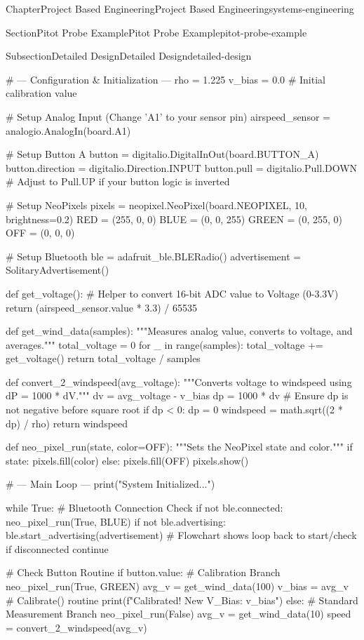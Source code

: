\documentclass[oneside,10pt,]{book}
\numberwithin{equation}{section}
\begin{document}
\begin{chapterptx}{Chapter}{Project Based Engineering}{}{Project Based Engineering}{}{}{systems-engineering}
\begin{sectionptx}{Section}{Pitot Probe Example}{}{Pitot Probe Example}{}{}{pitot-probe-example}
\begin{subsectionptx}{Subsection}{Detailed Design}{}{Detailed Design}{}{}{detailed-design}
\begin{preformatted}
# --- Configuration & Initialization ---
rho = 1.225
v_bias = 0.0  # Initial calibration value

# Setup Analog Input (Change 'A1' to your sensor pin)
airspeed_sensor = analogio.AnalogIn(board.A1)

# Setup Button A
button = digitalio.DigitalInOut(board.BUTTON_A)
button.direction = digitalio.Direction.INPUT
button.pull = digitalio.Pull.DOWN # Adjust to Pull.UP if your button logic is inverted

# Setup NeoPixels
pixels = neopixel.NeoPixel(board.NEOPIXEL, 10, brightness=0.2)
RED = (255, 0, 0)
BLUE = (0, 0, 255)
GREEN = (0, 255, 0)
OFF = (0, 0, 0)

# Setup Bluetooth
ble = adafruit_ble.BLERadio()
advertisement = SolitaryAdvertisement()

def get_voltage():
    # Helper to convert 16-bit ADC value to Voltage (0-3.3V)
    return (airspeed_sensor.value * 3.3) / 65535

def get_wind_data(samples):
    """Measures analog value, converts to voltage, and averages."""
    total_voltage = 0
    for _ in range(samples):
        total_voltage += get_voltage()
    return total_voltage / samples

def convert_2_windspeed(avg_voltage):
    """Converts voltage to windspeed using dP = 1000 * dV."""
    dv = avg_voltage - v_bias
    dp = 1000 * dv
    # Ensure dp is not negative before square root
    if dp < 0: dp = 0 
    windspeed = math.sqrt((2 * dp) / rho)
    return windspeed

def neo_pixel_run(state, color=OFF):
    """Sets the NeoPixel state and color."""
    if state:
        pixels.fill(color)
    else:
        pixels.fill(OFF)
    pixels.show()

# --- Main Loop ---
print("System Initialized...")

while True:
    # Bluetooth Connection Check
    if not ble.connected:
        neo_pixel_run(True, BLUE)
        if not ble.advertising:
            ble.start_advertising(advertisement)
        # Flowchart shows loop back to start/check if disconnected
        continue 
    
    # Check Button Routine
    if button.value:
        # Calibration Branch
        neo_pixel_run(True, GREEN)
        avg_v = get_wind_data(100)
        v_bias = avg_v  # Calibrate() routine
        print(f"Calibrated! New V_Bias: {v_bias}")
    else:
        # Standard Measurement Branch
        neo_pixel_run(False)
        avg_v = get_wind_data(10)
        speed = convert_2_windspeed(avg_v)
        

\end{preformatted}
\end{subsectionptx}
\end{sectionptx}
\end{chapterptx}
\end{document}
